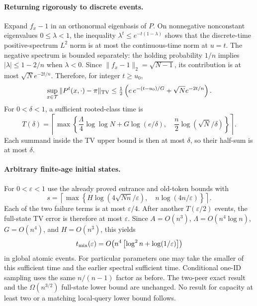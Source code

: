 \documentclass[11pt]{article}
\begin{document}
\paragraph{Returning rigorously to discrete events.}
Expand $f_x-1$ in an orthonormal eigenbasis of $P$. On nonnegative
nonconstant eigenvalues $0\le\lambda<1$, the inequality
$\lambda^t\le e^{-t(1-\lambda)}$ shows that the discrete-time
positive-spectrum $L^2$ norm is at most the continuous-time norm
at $u=t$. The negative spectrum is bounded separately: the holding
probability $1/n$ implies $|\lambda|\le1-2/n$ when $\lambda<0$.
Since $\|f_x-1\|_2=\sqrt{N-1}$, its contribution is at most
$\sqrt N e^{-2t/n}$. Therefore, for integer $t\ge u_0$,
\[
 \sup_{x\in\mathcal T}\|P^t(x,\cdot)-\pi\|_{\rm TV}
 \le\tfrac12\left(e\,e^{-(t-u_0)/G}+\sqrt N e^{-2t/n}\right).
\]
For $0<\delta<1$, a sufficient rooted-class time is
\[
 T(\delta)=\left\lceil\max\left\{
 \frac{\Lambda}4\log\log N+G\log(e/\delta),\quad
 \frac n2\log(\sqrt N/\delta)\right\}\right\rceil.
\]
Each summand inside the TV upper bound is then at most $\delta$,
so their half-sum is at most $\delta$.

\paragraph{Arbitrary finite-age initial states.}
For $0<\varepsilon<1$ use the already proved entrance and old-token
bounds with
\[
 s=\left\lceil\max\left\{
 H\log(4\sqrt{Nn}/\varepsilon),\quad
 n\log(4n/\varepsilon)\right\}\right\rceil.
\]
Each of the two failure terms is at most $\varepsilon/4$.
After another $T(\varepsilon/2)$ events, the full-state TV error is
therefore at most $\varepsilon$. Since $A=O(n^3)$, $\Lambda=O(n^4\log n)$,
$G=O(n^4)$, and $H=O(n^3)$, this yields
\[
 t_{\rm mix}(\varepsilon)
 =O\!\left(n^4\left[\log^2 n+\log(1/\varepsilon)\right]\right)
\]
in global atomic events. For particular parameters one may take the
smaller of this sufficient time and the earlier spectral sufficient time.
Conditional one-ID sampling uses the same
$n/(n-1)$ factor as before. The two-peer exact result and the
$\Omega(n^{3/2})$ full-state lower bound are unchanged. No result for
capacity at least two or a matching local-query lower bound follows.
\end{document}
